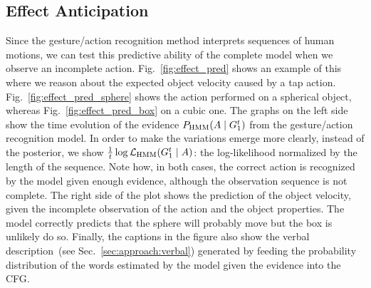 \subsection{Effect Anticipation}
\label{sec:results:anticipation_effects}

Since the gesture/action recognition method interprets sequences of human motions, we can test this predictive ability of the complete model when we observe an incomplete action.
Fig.~\ref{fig:effect_pred} shows an example of this where we reason about the expected object velocity caused by a tap action.
Fig.~\ref{fig:effect_pred_sphere} shows the action performed on a spherical object, whereas Fig.~\ref{fig:effect_pred_box} on a cubic one.
The graphs on the left side show the time evolution of the evidence $P_{\text{HMM}}(A \mid G_1^t)$ from the gesture/action recognition model.
In order to make the variations emerge more clearly, instead of the posterior, we show $\frac{1}{t} \log \mathcal{L}_\text{HMM} (G_1^t \mid A)$: the log-likelihood normalized by the length of the sequence.
Note how, in both cases, the correct action is recognized by the model given enough evidence, although the observation sequence is not complete.
The right side of the plot shows the prediction of the object velocity, given the incomplete observation of the action and the object properties.
The model correctly predicts that the sphere will probably move but the box is unlikely do so.
Finally, the captions in the figure also show the verbal description~(see Sec.~\ref{sec:approach:verbal}) generated by feeding the probability distribution of the words estimated by the model given the evidence into the \acl{CFG}.



